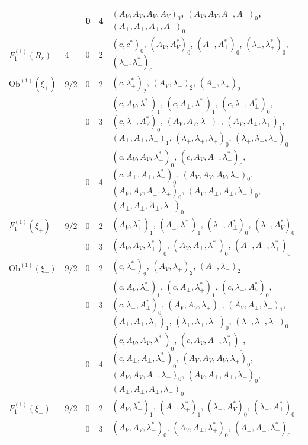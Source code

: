 \documentclass[11pt]{article}
\numberwithin{equation}{section}
\theoremstyle{plain}
\theoremstyle{definition}
\newcommand{\Ob}{\mathrm{Ob}}
\begin{document}
{\begin{longtable}{>{\raggedright}p{2.3cm}|p{0.6cm}|p{0.25cm}|p{0.25cm}|>{\raggedright\arraybackslash}p{11.6cm}}
 &  & 0 & 4 & $(A_V,A_V,A_V,A_V)_{0}$, $(A_V,A_V,A_\perp,A_\perp)_{0}$, $(A_\perp,A_\perp,A_\perp,A_\perp)_{0}$ \\
\hline
$F_1^{(1)}(R_r)$ & $4$ & 0 & 2 & $(c,c^*)_{0}$, $(A_V,A^*_V)_{0}$, $(A_\perp,A^*_\perp)_{0}$, $(\lambda_+,\lambda^*_+)_{0}$, $(\lambda_-,\lambda^*_-)_{0}$ \\
\hline
$\Ob^{(1)}(\xi_+)$ & $9/2$ & 0 & 2 & $(c,\lambda^*_+)_{2}$, $(A_V,\lambda_-)_{2}$, $(A_\perp,\lambda_+)_{2}$ \\
 &  & 0 & 3 & $(c,A_V,\lambda^*_+)_{1}$, $(c,A_\perp,\lambda^*_-)_{1}$, $(c,\lambda_+,A^*_\perp)_{0}$, $(c,\lambda_-,A^*_V)_{0}$, $(A_V,A_V,\lambda_-)_{1}$, $(A_V,A_\perp,\lambda_+)_{1}$, $(A_\perp,A_\perp,\lambda_-)_{1}$, $(\lambda_+,\lambda_+,\lambda_+)_{0}$, $(\lambda_+,\lambda_-,\lambda_-)_{0}$ \\
 &  & 0 & 4 & $(c,A_V,A_V,\lambda^*_+)_{0}$, $(c,A_V,A_\perp,\lambda^*_-)_{0}$, $(c,A_\perp,A_\perp,\lambda^*_+)_{0}$, $(A_V,A_V,A_V,\lambda_-)_{0}$, $(A_V,A_V,A_\perp,\lambda_+)_{0}$, $(A_V,A_\perp,A_\perp,\lambda_-)_{0}$, $(A_\perp,A_\perp,A_\perp,\lambda_+)_{0}$ \\
\hline
$F_1^{(1)}(\xi_+)$ & $9/2$ & 0 & 2 & $(A_V,\lambda^*_+)_{1}$, $(A_\perp,\lambda^*_-)_{1}$, $(\lambda_+,A^*_\perp)_{0}$, $(\lambda_-,A^*_V)_{0}$ \\
 &  & 0 & 3 & $(A_V,A_V,\lambda^*_+)_{0}$, $(A_V,A_\perp,\lambda^*_-)_{0}$, $(A_\perp,A_\perp,\lambda^*_+)_{0}$ \\
\hline
$\Ob^{(1)}(\xi_-)$ & $9/2$ & 0 & 2 & $(c,\lambda^*_-)_{2}$, $(A_V,\lambda_+)_{2}$, $(A_\perp,\lambda_-)_{2}$ \\
 &  & 0 & 3 & $(c,A_V,\lambda^*_-)_{1}$, $(c,A_\perp,\lambda^*_+)_{1}$, $(c,\lambda_+,A^*_V)_{0}$, $(c,\lambda_-,A^*_\perp)_{0}$, $(A_V,A_V,\lambda_+)_{1}$, $(A_V,A_\perp,\lambda_-)_{1}$, $(A_\perp,A_\perp,\lambda_+)_{1}$, $(\lambda_+,\lambda_+,\lambda_-)_{0}$, $(\lambda_-,\lambda_-,\lambda_-)_{0}$ \\
 &  & 0 & 4 & $(c,A_V,A_V,\lambda^*_-)_{0}$, $(c,A_V,A_\perp,\lambda^*_+)_{0}$, $(c,A_\perp,A_\perp,\lambda^*_-)_{0}$, $(A_V,A_V,A_V,\lambda_+)_{0}$, $(A_V,A_V,A_\perp,\lambda_-)_{0}$, $(A_V,A_\perp,A_\perp,\lambda_+)_{0}$, $(A_\perp,A_\perp,A_\perp,\lambda_-)_{0}$ \\
\hline
$F_1^{(1)}(\xi_-)$ & $9/2$ & 0 & 2 & $(A_V,\lambda^*_-)_{1}$, $(A_\perp,\lambda^*_+)_{1}$, $(\lambda_+,A^*_V)_{0}$, $(\lambda_-,A^*_\perp)_{0}$ \\
 &  & 0 & 3 & $(A_V,A_V,\lambda^*_-)_{0}$, $(A_V,A_\perp,\lambda^*_+)_{0}$, $(A_\perp,A_\perp,\lambda^*_-)_{0}$ \\

\end{longtable}}
\end{document}
